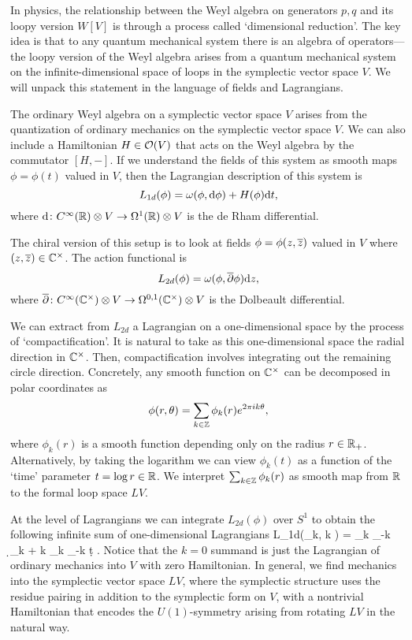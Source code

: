 \documentclass[11pt]{amsart}
\begin{document}
In physics, the relationship between the Weyl algebra on generators $p,q$ and its loopy version $W[V]$ is through a process called `dimensional reduction'.
The key idea is that to any quantum mechanical system there is an algebra of operators---the loopy version of the Weyl algebra arises from a quantum mechanical system on the infinite-dimensional space of loops in the symplectic vector space $V$. 
We will unpack this statement in the language of fields and Lagrangians.

The ordinary Weyl algebra on a symplectic vector space $V$ arises from the quantization of ordinary mechanics on the symplectic vector space $V$.
We can also include a Hamiltonian $H \in \mathcal O(V)$ that acts on the Weyl algebra by the commutator $[H,-]$.
If we understand the fields of this system as smooth maps $\phi = \phi(t)$ valued in $V$, then the Lagrangian description of this system is 
\[
L_{1d} (\phi) = \omega(\phi , {\rm d} \phi) + H(\phi) {\rm d} t ,
\]
where ${\rm d} \colon C^\infty(\mathbb R) \otimes V \to \Omega^1(\mathbb R) \otimes V$ is the de Rham differential. 

The chiral version of this setup is to look at fields $\phi = \phi(z,{\overline{z}})$ valued in $V$ where $(z,{\overline{z}}) \in \mathbb C^\times$.
The action functional is 
\[
L_{2d}(\phi) = \omega(\phi, {\overline{\partial}} \phi) {\rm d} z ,
\]
where ${\overline{\partial}} \colon C^\infty(\mathbb C^\times)\otimes V \to \Omega^{0,1}(\mathbb C^\times) \otimes V$ is the Dolbeault differential.

We can extract from $L_{2d}$ a Lagrangian on a one-dimensional space by the process of `compactification'. 
It is natural to take as this one-dimensional space the radial direction in $\mathbb C^\times$.
Then, compactification involves integrating out the remaining circle direction.
Concretely, any smooth function on $\mathbb C^\times$ can be decomposed in polar coordinates as
\[
\phi(r,\theta) = \sum_{k \in \mathbb Z} \phi_k(r) e^{2 \pi i k \theta} ,
\]
where $\phi_k(r)$ is a smooth function depending only on the radius $r \in \mathbb R_+$.
Alternatively, by taking the logarithm we can view $\phi_k(t)$ as a function of the `time' parameter $t = \log r \in \mathbb R$. 
We interpret $\sum_{k \in \mathbb Z} \phi_k(r)$ as smooth map from $\mathbb R$ to the formal loop space $LV$. 

At the level of Lagrangians we can integrate $L_{2d}(\phi)$ over $S^1$ to obtain the following infinite sum of one-dimensional Lagrangians
\beqn
L_{1d}(\phi_k, k \in \ZZ) = \sum_{k\in \ZZ} \phi_{-k} \d \phi_{k} + k \phi_k \phi_{-k} \d t .
\eeqn 
Notice that the $k=0$ summand is just the Lagrangian of ordinary mechanics into $V$ with zero Hamiltonian. 
In general, we find mechanics into the symplectic vector space $LV$, where the symplectic structure uses the residue pairing in addition to the symplectic form on $V$, with a nontrivial Hamiltonian that encodes the $U(1)$-symmetry arising from rotating $LV$ in the natural way.
\end{document}
